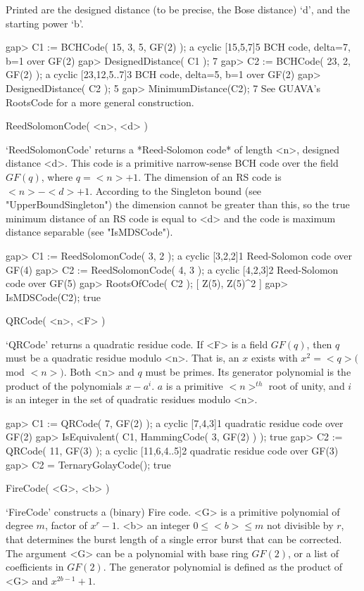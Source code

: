 Printed are  the designed distance  (to be  precise, the Bose distance)
`d', and the starting power `b'.

\beginexample
gap> C1 := BCHCode( 15, 3, 5, GF(2) );
a cyclic [15,5,7]5 BCH code, delta=7, b=1 over GF(2)
gap> DesignedDistance( C1 );
7
gap> C2 := BCHCode( 23, 2, GF(2) );
a cyclic [23,12,5..7]3 BCH code, delta=5, b=1 over GF(2)
gap> DesignedDistance( C2 );       
5
gap> MinimumDistance(C2);
7 
\endexample
See GUAVA's RootsCode for a more general construction.
 
\>ReedSolomonCode( <n>, <d> )

`ReedSolomonCode' returns a  *Reed-Solomon code* of length  <n>, designed
distance <d>. This  code  is a primitive  narrow-sense BCH  code over the
field $GF(q)$,  where  $q=<n>+1$.  The  dimension   of  an   RS code   is
$<n>-<d>+1$. According to the Singleton bound (see "UpperBoundSingleton")
the dimension cannot  be greater than this, so  the true minimum distance
of an RS code is equal to <d> and the code  is maximum distance separable
(see "IsMDSCode").

\beginexample
gap> C1 := ReedSolomonCode( 3, 2 );
a cyclic [3,2,2]1 Reed-Solomon code over GF(4)
gap> C2 := ReedSolomonCode( 4, 3 );
a cyclic [4,2,3]2 Reed-Solomon code over GF(5)
gap> RootsOfCode( C2 );
[ Z(5), Z(5)^2 ]
gap> IsMDSCode(C2);
true 
\endexample

\>QRCode( <n>, <F> )

`QRCode' returns a  quadratic residue code. If  <F>  is a field  $GF(q)$,
then $q$ must be a  quadratic residue modulo  <n>. That is, an $x$ exists
with $x^2=<q>  ($mod  $<n>)$. Both  <n> and $q$   must  be primes.   Its
generator polynomial is the product of the  polynomials $x-a^i$. $a$ is a
primitive $<n>^{th}$ root of unity, and  $i$ is an  integer in the set of
quadratic residues modulo <n>.

\beginexample
gap> C1 := QRCode( 7, GF(2) );
a cyclic [7,4,3]1 quadratic residue code over GF(2)
gap> IsEquivalent( C1, HammingCode( 3, GF(2) ) );
true
gap> C2 := QRCode( 11, GF(3) );
a cyclic [11,6,4..5]2 quadratic residue code over GF(3)
gap> C2 = TernaryGolayCode();
true 
\endexample

\>FireCode( <G>, <b> )

`FireCode' constructs a (binary) Fire code. <G> is a primitive polynomial
of degree $m$, factor of $x^r-1$. <b> an integer $0 \leq  <b> \leq m$ not
divisible by $r$,  that  determines the  burst length  of a  single error
burst  that can be  corrected. The argument <G> can  be a polynomial with
base ring  $GF(2)$, or a list of  coefficients in $GF(2)$.  The generator
polynomial is defined as the product of <G> and $x^{2b-1}+1$.

